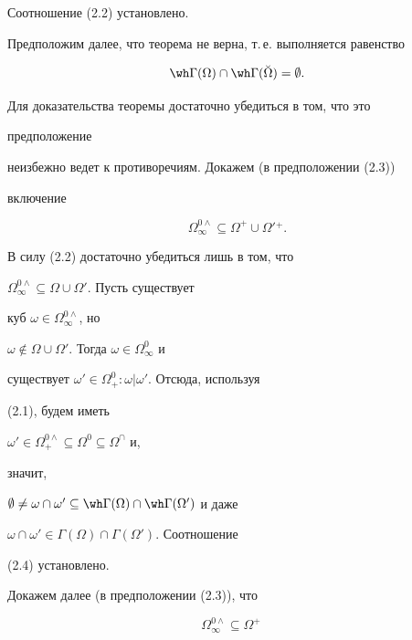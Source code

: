 \begin{pf}
Соотношение (2.2) установлено. 


 


Предположим далее, что теорема не верна, т.\,е. выполняется равенство 


\begin{equation} 


\wh\Gamma(\Omega)\cap\wh\Gamma(\Breve\Omega)=\emptyset. 


\end{equation} 


Для доказательства теоремы достаточно убедиться в том, что это 


предположение 


неизбежно ведет к противоречиям. Докажем (в предположении (2.3))


включение 


\begin{equation} 


\Omega^{0\wedge}_\infty\subseteq\Omega^+\cup\Omega'{}^+. 


\end{equation} 


В силу (2.2) достаточно убедиться лишь в том, что 


$\Omega^{0\wedge}_\infty\subseteq\Omega\cup\Omega'$. Пусть существует 


куб $\omega\in\Omega^{0\wedge}_\infty$, но 


$\omega\notin\Omega\cup\Omega'$. Тогда $\omega\in\Omega^0_\infty$ и 


существует $\omega'\in\Omega^0_+:\omega|\omega'$. Отсюда, используя 


(2.1), будем иметь 


$\omega'\in\Omega^{0\wedge}_+\subseteq\Omega^0\subseteq\Omega^\cap$ и, 


значит, 


$\emptyset\ne\omega\cap\omega'\subseteq\wh\Gamma(\Omega)\cap\wh\Gamma 


(\Omega')$ и даже 


$\omega\cap\omega'\in\Gamma(\Omega)\cap\Gamma(\Omega')$. Соотношение 


(2.4) установлено. 


 


Докажем далее (в предположении (2.3)), что 


\begin{equation} 


\Omega^{0\wedge}_\infty\subseteq\Omega^+\quad 



\end{equation}
\end{pf}
